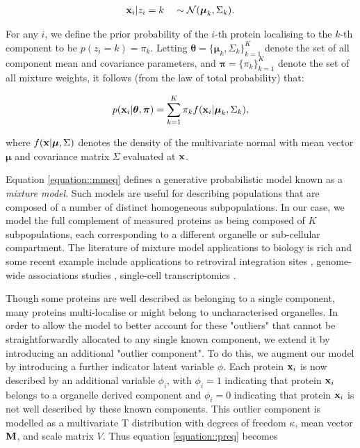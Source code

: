 \documentclass[10pt,letterpaper]{article}\usepackage[]{graphicx}\usepackage[]{color}
\begin{document}
\begin{align}
{\bf x}_i | z_i = k \quad \sim \mathcal{N}(\boldsymbol{\mu}_k, \Sigma_k). \label{equation::preq}
\end{align}

For any $i$, we define the prior probability of the $i$-th protein
localising to the $k$-th component to be $p(z_i = k) = \pi_k$.
Letting
$\boldsymbol{\theta} = \{\boldsymbol{\mu}_k, \Sigma_k \}_{k = 1}^K$
denote the set of all component mean and covariance parameters, and
$\boldsymbol{\pi} = \{\pi_k\}_{k = 1}^K$ denote the set of all mixture
weights, it follows (from the law of total probability) that:

\begin{align}
p({\bf x}_i | \boldsymbol{\theta}, \boldsymbol{\pi} ) = \sum_{k = 1}^K \pi_k f({\bf x}_i|\boldsymbol{\mu}_k, \Sigma_k),\label{equation::mmeq}
\end{align}

where $f({\bf x} | \boldsymbol{\mu}, \Sigma)$ denotes the density of
the multivariate normal with mean vector $\boldsymbol{\mu}$ and
covariance matrix $\Sigma$ evaluated at ${\bf x}$.

Equation \eqref{equation::mmeq} defines a generative probabilistic
model known as a {\em mixture model}.  Such models are useful for
describing populations that are composed of a number of distinct
homogeneous subpopulations.  In our case, we model the full complement
of measured proteins as being composed of $K$ subpopulations, each
corresponding to a different organelle or sub-cellular
compartment. The literature of mixture model applications to biology
is rich and some recent example include applications to retroviral
integration sites \cite{Kirk:2016}, genome-wide associations studies
\cite{Liley:2017}, single-cell transcriptomics
\cite{Lonnberg:2017} {\color{black}{and affinity purification MS proteomics}}
\cite{Choi:2010}.

Though some proteins are well described as belonging to a single
component, many proteins multi-localise or might belong to
uncharacterised organelles. In order to allow the model to better
account for these "outliers" that cannot be straightforwardly
allocated to any single known component, we extend it by introducing
an additional "outlier component". To do this, we augment our model by
introducing a further indicator latent variable $\phi$. Each protein
${\bf x}_i$ is now described by an additional variable $\phi_i$, with
$\phi_i = 1$ indicating that protein ${\bf x}_i$ belongs to a
organelle derived component and $\phi_i = 0$ indicating that protein
${\bf x}_i$ is not well described by these known components. This
outlier component is modelled as a multivariate T distribution with
degrees of freedom $\kappa$, mean vector $\bf{M}$, and scale matrix
$V$. Thus equation \eqref{equation::preq} becomes
\end{document}
